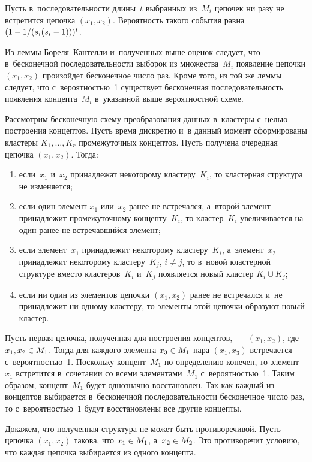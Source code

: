 \begin{multicols}{2}
  Пусть в~последовательности длины~$t$ выбранных из~$M_i$ цепочек ни разу 
не встретится цепочка $(x_1,x_2)$. Вероятность такого события равна $(1-
1/(s_i(s_i\hm-1)))^t$. 
  
  Из леммы Бореля--Кан\-тел\-ли и~полученных выше оценок следует, что 
в~бесконечной последовательности выборок из множества~$M_i$ появление 
цепочки $(x_1,x_2)$ произойдет бесконечное число раз. Кроме того, из той же 
леммы следует, что с~вероятностью~1 существует бесконечная 
последовательность появления концепта~$M_i$ в~указанной выше вероятностной 
схеме. 
  
  Рассмотрим бесконечную схему преобразования данных в~кластеры с~целью 
построения концептов. Пусть время дискретно и~в данный момент сформированы 
кластеры $K_1,\ldots ,K_r$ промежуточных концептов. Пусть получена очередная 
цепочка $(x_1,x_2)$. Тогда:
  \begin{enumerate}[(1)]
\item если~$x_1$ и~$x_2$ принадлежат некоторому клас\-те\-ру~$K_i$, то 
кластерная структура не изменяется; 
\item если один элемент $x_1$ или~$x_2$ ранее не встречался, а~второй 
элемент принадлежит промежуточному концепту~$K_i$, то клас\-тер~$K_i$ 
увеличивается на один ранее не встречавшийся элемент; 
\item если элемент~$x_1$ принадлежит некоторому клас\-те\-ру~$K_i$, 
а~элемент~$x_2$ принадлежит некоторому кластеру~$K_j$, $i\not= j$, то 
в~новой клас\-тер\-ной структуре вместо кластеров~$K_i$ и~$K_j$ появляется 
новый кластер $K_i\cup K_j$;
\item если ни один из элементов цепочки $(x_1,x_2)$ ранее не встречался 
и~не принадлежит ни одному кластеру, то элементы этой цепочки образуют 
новый кластер. 
\end{enumerate}
  
  Пусть первая цепочка, полученная для по\-стро\-ения концептов,~--- $(x_1, x_2)$, 
где $x_1, x_2\hm\in M_1$. Тогда для каждого элемента $x_3\hm\in M_1$ пара 
$(x_1, x_3)$ встречается с~ве\-ро\-ят\-н\-остью~1. Поскольку концепт~$M_1$ по 
определению конечен, то элемент~$x_1$ встретится в~сочетании со всеми 
элементами~$M_1$ с~ве\-ро\-ят\-ностью~1. Таким образом, концепт~$M_1$ будет 
однозначно восстановлен. Так как каждый из концептов выбирается 
в~бесконечной последовательности бесконечное число раз, то с~вероятностью~1 
будут восстановлены все другие концепты. 
  
  Докажем, что полученная структура не может быть противоречивой. Пусть 
цепочка $(x_1, x_2)$ такова, что $x_1\hm\in M_1$, а~$x_2\hm\in M_2$. Это 
противоречит условию, что каждая цепочка выбирается из одного концепта. 
  

\end{multicols}
